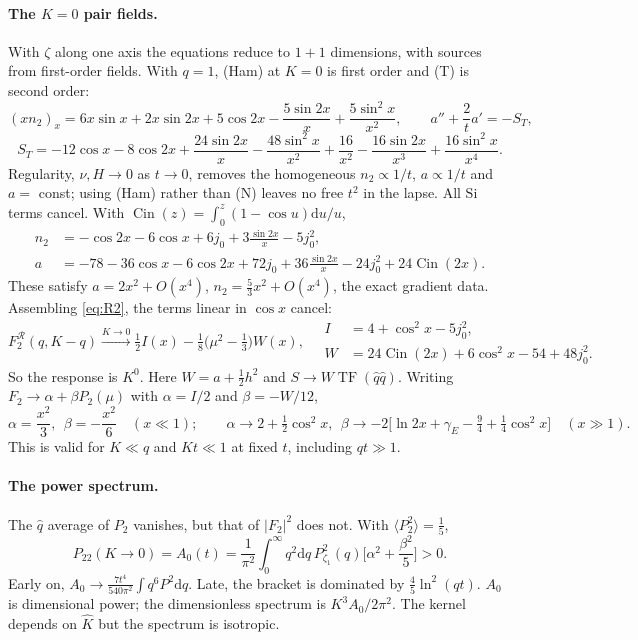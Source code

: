 \documentclass[10pt]{article}
\newcommand{\dd}{\mathrm{d}}
\newcommand{\TF}{\operatorname{TF}}
\newcommand{\Cin}{\operatorname{Cin}}
\newcommand{\R}{\mathcal R}
\newcommand{\Kh}{\hat K}
\newcommand{\qh}{\hat q}
\begin{document}
\paragraph{The $K=0$ pair fields.} With $\zeta$ along one axis the equations reduce to $1{+}1$ dimensions, with sources from first-order fields. With $q=1$, (Ham) at $K=0$ is first order and (T) is second order:
\[
(xn_2)_x=6x\sin x+2x\sin2x+5\cos2x-\frac{5\sin2x}{x}+\frac{5\sin^2x}{x^2},\qquad a''+\frac2ta'=-S_T,
\]
\[
S_T=-12\cos x-8\cos2x+\frac{24\sin2x}{x}-\frac{48\sin^2x}{x^2}+\frac{16}{x^2}-\frac{16\sin2x}{x^3}+\frac{16\sin^2x}{x^4}.
\]
Regularity, $\nu,H\to0$ as $t\to0$, removes the homogeneous $n_2\propto1/t$, $a\propto1/t$ and $a=$ const; using (Ham) rather than (N) leaves no free $t^2$ in the lapse. All $\mathrm{Si}$ terms cancel. With $\Cin(z)=\int_0^z(1-\cos u)\dd u/u$,
\begin{align}
n_2&=-\cos2x-6\cos x+6j_0+3\frac{\sin2x}{x}-5j_0^2,\\
a&=-78-36\cos x-6\cos2x+72j_0+36\frac{\sin2x}{x}-24j_0^2+24\Cin(2x).
\end{align}
These satisfy $a=2x^2+O(x^4)$, $n_2=\frac53x^2+O(x^4)$, the exact gradient data. Assembling \eqref{eq:R2}, the terms linear in $\cos x$ cancel:
\begin{equation}\label{eq:F2-limit}
\boxed{F_2^{\R}(q,K-q)\xrightarrow{K\to0}\tfrac12I(x)-\tfrac18\Big(\mu^2-\tfrac13\Big)W(x),\quad
\begin{aligned}I&=4+\cos^2x-5j_0^2,\\ W&=24\Cin(2x)+6\cos^2x-54+48j_0^2.\end{aligned}}
\end{equation}
So the response is $K^0$. Here $W=a+\frac12h^2$ and $S\to W\TF(\qh\qh)$. Writing $F_2\to\alpha+\beta P_2(\mu)$ with $\alpha=I/2$ and $\beta=-W/12$,
\begin{equation}
\alpha=\frac{x^2}{3},\ \ \beta=-\frac{x^2}{6}\quad(x\ll1);\qquad
\alpha\to2+\tfrac12\cos^2x,\ \ \beta\to-2\big[\ln2x+\gamma_E-\tfrac94+\tfrac14\cos^2x\big]\quad(x\gg1).
\end{equation}
This is valid for $K\ll q$ and $Kt\ll1$ at fixed $t$, including $qt\gg1$.

\paragraph{The power spectrum.} The $\qh$ average of $P_2$ vanishes, but that of $|F_2|^2$ does not. With $\langle P_2^2\rangle=\frac15$,
\begin{equation}\label{eq:A0}
\boxed{P_{22}(K\to0)=A_0(t)=\frac1{\pi^2}\int_0^\infty\!q^2\dd q\,P_{\zeta_1}^2(q)\Big[\alpha^2+\frac{\beta^2}5\Big]>0.}
\end{equation}
Early on, $A_0\to\frac{7t^4}{540\pi^2}\int q^6P^2\dd q$. Late, the bracket is dominated by $\frac45\ln^2(qt)$. $A_0$ is dimensional power; the dimensionless spectrum is $K^3A_0/2\pi^2$. The kernel depends on $\Kh$ but the spectrum is isotropic.
\end{document}
